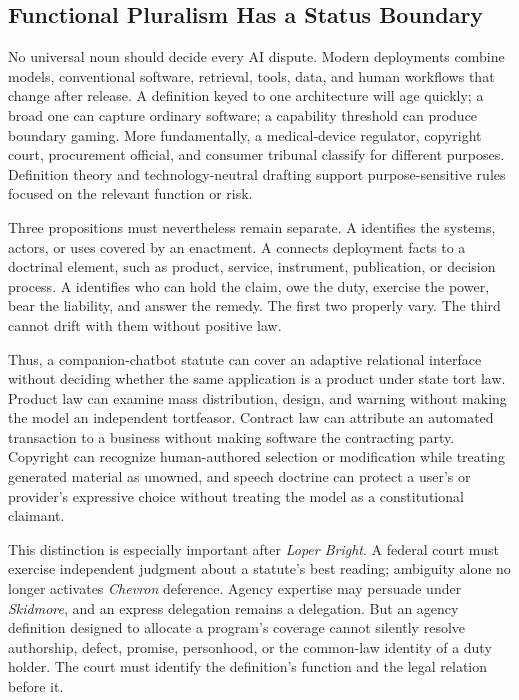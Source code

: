 \subsection{Functional Pluralism Has a Status Boundary}

No universal noun should decide every AI dispute. Modern deployments combine models, conventional software, retrieval, tools, data, and human workflows that change after release. A definition keyed to one architecture will age quickly; a broad one can capture ordinary software; a capability threshold can produce boundary gaming. More fundamentally, a medical-device regulator, copyright court, procurement official, and consumer tribunal classify for different purposes. Definition theory and technology-neutral drafting support purpose-sensitive rules focused on the relevant function or risk.

Three propositions must nevertheless remain separate. A  identifies the systems, actors, or uses covered by an enactment. A  connects deployment facts to a doctrinal element, such as product, service, instrument, publication, or decision process. A  identifies who can hold the claim, owe the duty, exercise the power, bear the liability, and answer the remedy. The first two properly vary. The third cannot drift with them without positive law.

Thus, a companion-chatbot statute can cover an adaptive relational interface without deciding whether the same application is a product under state tort law. Product law can examine mass distribution, design, and warning without making the model an independent tortfeasor. Contract law can attribute an automated transaction to a business without making software the contracting party. Copyright can recognize human-authored selection or modification while treating generated material as unowned, and speech doctrine can protect a user's or provider's expressive choice without treating the model as a constitutional claimant.

This distinction is especially important after \emph{Loper Bright}. A federal court must exercise independent judgment about a statute's best reading; ambiguity alone no longer activates \emph{Chevron} deference. Agency expertise may persuade under \emph{Skidmore}, and an express delegation remains a delegation. But an agency definition designed to allocate a program's coverage cannot silently resolve authorship, defect, promise, personhood, or the common-law identity of a duty holder. The court must identify the definition's function and the legal relation before it.


